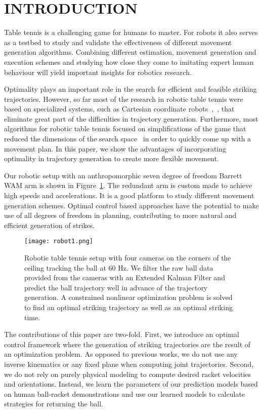 \section{INTRODUCTION}

Table tennis is a challenging game for humans to master. For robots it also serves as a testbed to study and validate the effectiveness of different movement generation algorithms. Combining different estimation, movement generation and execution schemes and studying how close they come to imitating expert human behaviour will yield important insights for robotics research.

Optimality plays an important role in the search for efficient and feasible striking trajectories. However, so far most of the research in robotic table tennis were based on specialized systems, such as Cartesian coordinate robots~\cite{Matsushima05},~\cite{Yanlong13}, that eliminate great part of the difficulties in trajectory generation. Furthermore, most algorithms for robotic table tennis focused on simplifications of the game that reduced the dimensions of the search space~\cite{Muelling13} in order to quickly come up with a movement plan. In this paper, we show the advantages of incorporating optimality in trajectory generation to create more flexible movement. 

Our robotic setup with an anthropomorphic seven degree of freedom Barrett WAM arm is shown in Figure~\ref{robot}. The redundant arm is custom made to achieve high speeds and accelerations. It is a good platform to study different movement generation schemes. Optimal control based approaches have the potential to make use of all degrees of freedom in planning, contributing to more natural and efficient generation of strikes. %

\begin{figure}[t!]
\center
\texttt{[image: robot1.png]}			
\caption{Robotic table tennis setup with four cameras on the corners of the ceiling tracking the ball at 60 Hz. We filter the raw ball data provided from the cameras with an Extended Kalman Filter and predict the ball trajectory well in advance of the trajectory generation. A constrained nonlinear optimization problem is solved to find an optimal striking trajectory as well as an optimal striking time.}
\label{robot}
\end{figure}

The contributions of this paper are two-fold. First, we introduce an optimal control framework where the generation of striking trajectories are the result of an optimization problem. As opposed to previous works, we do not use any inverse kinematics or any fixed plane when computing joint trajectories. Second, we do not rely on purely physical modeling to compute desired racket velocities and orientations. Instead, we learn the parameters of our prediction models based on human ball-racket demonstrations and use our learned models to calculate strategies for returning the ball. %

